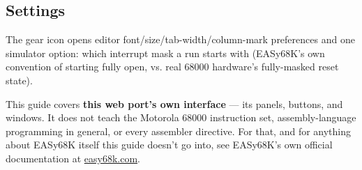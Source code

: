 \subsection*{Settings}
The gear icon opens editor font/size/tab-width/column-mark preferences and one simulator option: which interrupt mask a run starts with (EASy68K's own convention of starting fully open, vs. real 68000 hardware's fully-masked reset state).

\begin{tcolorbox}[colback=blue!5!white,colframe=blue!60!black,title=Note]
This guide covers \textbf{this web port's own interface} — its panels, buttons, and windows. It does not teach the Motorola 68000 instruction set, assembly-language programming in general, or every assembler directive. For that, and for anything about EASy68K itself this guide doesn't go into, see EASy68K's own official documentation at \href{http://www.easy68k.com/}{easy68k.com}.
\end{tcolorbox}